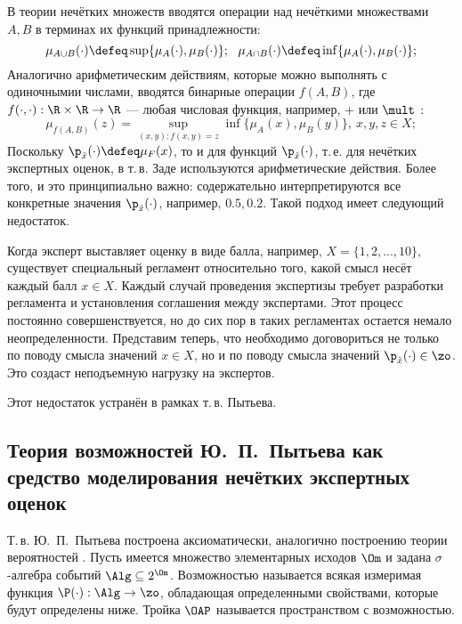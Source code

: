 В теории нечётких множеств вводятся операции над нечёткими множествами $A, B$ в терминах их функций принадлежности: 
\begin{equation*}
  \mu_{A \cup B}(\cdot) \defeq \sup\{\mu_{A}(\cdot),\mu_{B}(\cdot)\}; \ \ \mu_{A \cap B}(\cdot) \defeq \inf\{\mu_{A}(\cdot),\mu_{B}(\cdot)\}; 
\end{equation*}
Аналогично арифметическим действиям, которые можно выполнять с одиночнымии числами, вводятся бинарные операции $f(A, B)$, где $f(\cdot, \cdot): \R \times \R \rightarrow \R$ --- любая числовая функция, например, $\plus$ или $\mult$ \cite{7}: 
\begin{equation*}
  \mu_{f(A, B)}(z) = \underset{(x, y): f(x, y) = z}\sup \inf\{\mu_{A}(x),\mu_{B}(y)\}, \ x,y,z \in X; 
\end{equation*}
Поскольку $\p_{\tilde x}(\cdot) \defeq \mu_{F}(x)$, то и для функций $\p_{\tilde x}(\cdot)$, т.\,е. для нечётких экспертных оценок, в т.\,в. Заде используются арифметические действия. Более того, и это принципиально важно: содержательно интерпретируются все конкретные значения $\p_{\tilde x}(\cdot)$, например, $0.5, 0.2$. Такой подход имеет следующий недостаток.

Когда эксперт выставляет оценку в виде балла, например, $X = \{1, 2, ..., 10\}$, существует специальный регламент относительно того, какой смысл несёт каждый балл $x \in X$. Каждый случай проведения экспертизы требует разработки регламента и установления соглашения между экспертами. Этот процесс постоянно совершенствуется, но до сих пор в таких регламентах остается немало неопределенности. Представим теперь, что необходимо договориться не только по поводу смысла значений $x \in X$, но и по поводу смысла значений $\p_{\tilde x}(\cdot) \in \zo$. Это создаст неподъемную нагрузку на экспертов. 

Этот недостаток устранён в рамках т.\,в. Пытьева.

\subsection{Теория возможностей Ю.~П.~Пытьева как средство моделирования нечётких экспертных оценок}

Т.\,в. Ю.~П.~Пытьева построена аксиоматически, аналогично построению теории вероятностей \cite{4,8}. Пусть имеется множество элементарных исходов $\Om$ и задана $\sigma$-алгебра событий $\Alg \subseteq 2^{\Om}$. Возможностью называется всякая измеримая функция $\P(\cdot): \Alg \rightarrow \zo$, обладающая определенными свойствами, которые будут определены ниже. Тройка $\OAP$ называется пространством с возможностью. 

